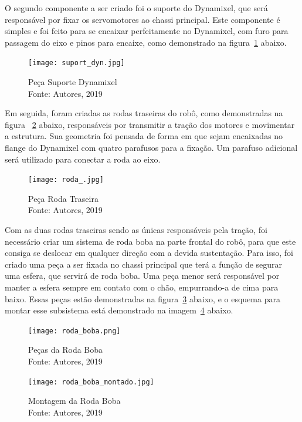O segundo componente a ser criado foi o suporte do Dynamixel, que será responsável por fixar os servomotores ao chassi principal. Este componente é simples e foi feito para se encaixar perfeitamente no Dynamixel, com furo para passagem do eixo e pinos
para encaixe, como demonstrado na figura~\ref{fig:suport_dyn} abaixo.

\begin{figure}[h!]
	\centering
	\texttt{[image: suport\_dyn.jpg]}\\
	\caption{Peça Suporte Dynamixel \\ Fonte: Autores, 2019}
	\label{fig:suport_dyn}
\end{figure}

Em seguida, foram criadas as rodas traseiras do robô, como demonstradas na figura ~\ref{fig:roda_} abaixo, responsáveis por transmitir a tração dos motores e movimentar a estrutura. Sua geometria foi pensada de forma em que sejam encaixadas no flange do Dynamixel com quatro parafusos para a fixação. Um parafuso adicional será utilizado para conectar a roda ao eixo.

\begin{figure}[h!]
	\centering
	\texttt{[image: roda\_.jpg]}\\
	\caption{Peça Roda Traseira \\ Fonte: Autores, 2019}
	\label{fig:roda_}
\end{figure}

Com as duas rodas traseiras sendo as únicas responsáveis pela tração, foi necessário criar um sistema de roda boba na parte frontal do robô, para que este consiga se deslocar em qualquer direção com a devida sustentação. Para isso, foi criado uma peça
a ser fixada no chassi principal que terá a função de segurar uma esfera, que servirá de roda boba. Uma peça menor será responsável por manter a esfera sempre em contato com o chão, empurrando-a de cima para baixo. Essas peças estão demonstradas na figura~\ref{fig:roda_boba} abaixo, e o esquema para montar esse subsistema está demonstrado na imagem~\ref{fig:roda_boba_montado} abaixo.

\begin{figure}[h!]
	\centering
	\texttt{[image: roda\_boba.png]}\\
	\caption{Peças da Roda Boba \\ Fonte: Autores, 2019}
	\label{fig:roda_boba}
\end{figure}

\begin{figure}[h!]
	\centering
	\texttt{[image: roda\_boba\_montado.jpg]}\\
	\caption{Montagem da Roda Boba \\ Fonte: Autores, 2019}
	\label{fig:roda_boba_montado}
\end{figure}

